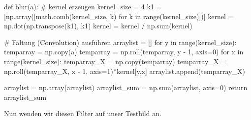 \documentclass[
  a4paper,
  DIV=11]{scrreprt}
\newenvironment{Shaded}{\begin{snugshade}}{\end{snugshade}}
\newcommand{\BuiltInTok}[1]{\textcolor[rgb]{0.00,0.23,0.31}{#1}}
\newcommand{\CommentTok}[1]{\textcolor[rgb]{0.37,0.37,0.37}{#1}}
\newcommand{\ControlFlowTok}[1]{\textcolor[rgb]{0.00,0.23,0.31}{#1}}
\newcommand{\DecValTok}[1]{\textcolor[rgb]{0.68,0.00,0.00}{#1}}
\newcommand{\KeywordTok}[1]{\textcolor[rgb]{0.00,0.23,0.31}{#1}}
\newcommand{\NormalTok}[1]{\textcolor[rgb]{0.00,0.23,0.31}{#1}}
\newcommand{\OperatorTok}[1]{\textcolor[rgb]{0.37,0.37,0.37}{#1}}
\theoremstyle{definition}
\theoremstyle{definition}
\theoremstyle{remark}
\begin{document}
\begin{Shaded}
\begin{Highlighting}[]
\KeywordTok{def}\NormalTok{ blur(a): }
    \CommentTok{\# kernel erzeugen}
\NormalTok{    kernel\_size }\OperatorTok{=} \DecValTok{4}
\NormalTok{    k1 }\OperatorTok{=}\NormalTok{ [np.array([math.comb(kernel\_size, k) }\ControlFlowTok{for}\NormalTok{ k }\KeywordTok{in} \BuiltInTok{range}\NormalTok{(kernel\_size)])]}
\NormalTok{    kernel }\OperatorTok{=}\NormalTok{ np.dot(np.transpose(k1), k1)}
\NormalTok{    kernel }\OperatorTok{=}\NormalTok{ kernel }\OperatorTok{/}\NormalTok{ np.}\BuiltInTok{sum}\NormalTok{(kernel)}
    
    \CommentTok{\# Faltung (Convolution) ausführen}
\NormalTok{    arraylist }\OperatorTok{=}\NormalTok{ []}
    \ControlFlowTok{for}\NormalTok{ y }\KeywordTok{in} \BuiltInTok{range}\NormalTok{(kernel\_size):}
\NormalTok{        temparray }\OperatorTok{=}\NormalTok{ np.copy(a)}
\NormalTok{        temparray }\OperatorTok{=}\NormalTok{ np.roll(temparray, y }\OperatorTok{{-}} \DecValTok{1}\NormalTok{, axis}\OperatorTok{=}\DecValTok{0}\NormalTok{)}
        \ControlFlowTok{for}\NormalTok{ x }\KeywordTok{in} \BuiltInTok{range}\NormalTok{(kernel\_size):}
\NormalTok{            temparray\_X }\OperatorTok{=}\NormalTok{ np.copy(temparray)}
\NormalTok{            temparray\_X }\OperatorTok{=}\NormalTok{ np.roll(temparray\_X, x }\OperatorTok{{-}} \DecValTok{1}\NormalTok{, axis}\OperatorTok{=}\DecValTok{1}\NormalTok{)}\OperatorTok{*}\NormalTok{kernel[y,x]}
\NormalTok{            arraylist.append(temparray\_X)}

\NormalTok{    arraylist }\OperatorTok{=}\NormalTok{ np.array(arraylist)}
\NormalTok{    arraylist\_sum }\OperatorTok{=}\NormalTok{ np.}\BuiltInTok{sum}\NormalTok{(arraylist, axis}\OperatorTok{=}\DecValTok{0}\NormalTok{)}
    \ControlFlowTok{return}\NormalTok{ arraylist\_sum}
\end{Highlighting}
\end{Shaded}

Nun wenden wir diesen Filter auf unser Testbild an.
\end{document}

